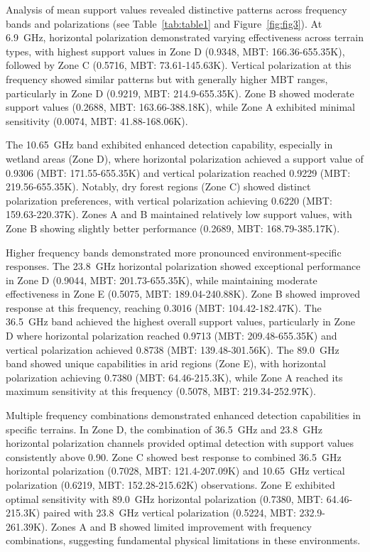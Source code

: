 \documentclass[preprint,review,12pt,authoryear]{elsarticle}
\begin{document}
Analysis of mean support values revealed distinctive patterns across frequency bands and polarizations (see Table~\ref{tab:table1} and Figure~\ref{fig:fig3}). At 6.9~GHz, horizontal polarization demonstrated varying effectiveness across terrain types, with highest support values in Zone D (0.9348, MBT: 166.36-655.35K), followed by Zone C (0.5716, MBT: 73.61-145.63K). Vertical polarization at this frequency showed similar patterns but with generally higher MBT ranges, particularly in Zone D (0.9219, MBT: 214.9-655.35K). Zone B showed moderate support values (0.2688, MBT: 163.66-388.18K), while Zone A exhibited minimal sensitivity (0.0074, MBT: 41.88-168.06K).

The 10.65~GHz band exhibited enhanced detection capability, especially in wetland areas (Zone D), where horizontal polarization achieved a support value of 0.9306 (MBT: 171.55-655.35K) and vertical polarization reached 0.9229 (MBT: 219.56-655.35K). Notably, dry forest regions (Zone C) showed distinct polarization preferences, with vertical polarization achieving 0.6220 (MBT: 159.63-220.37K). Zones A and B maintained relatively low support values, with Zone B showing slightly better performance (0.2689, MBT: 168.79-385.17K).

Higher frequency bands demonstrated more pronounced environment-specific responses. The 23.8~GHz horizontal polarization showed exceptional performance in Zone D (0.9044, MBT: 201.73-655.35K), while maintaining moderate effectiveness in Zone E (0.5075, MBT: 189.04-240.88K). Zone B showed improved response at this frequency, reaching 0.3016 (MBT: 104.42-182.47K). The 36.5~GHz band achieved the highest overall support values, particularly in Zone D where horizontal polarization reached 0.9713 (MBT: 209.48-655.35K) and vertical polarization achieved 0.8738 (MBT: 139.48-301.56K). The 89.0~GHz band showed unique capabilities in arid regions (Zone E), with horizontal polarization achieving 0.7380 (MBT: 64.46-215.3K), while Zone A reached its maximum sensitivity at this frequency (0.5078, MBT: 219.34-252.97K).

Multiple frequency combinations demonstrated enhanced detection capabilities in specific terrains. In Zone D, the combination of 36.5~GHz and 23.8~GHz horizontal polarization channels provided optimal detection with support values consistently above 0.90. Zone C showed best response to combined 36.5~GHz horizontal polarization (0.7028, MBT: 121.4-207.09K) and 10.65~GHz vertical polarization (0.6219, MBT: 152.28-215.62K) observations. Zone E exhibited optimal sensitivity with 89.0~GHz horizontal polarization (0.7380, MBT: 64.46-215.3K) paired with 23.8~GHz vertical polarization (0.5224, MBT: 232.9-261.39K). Zones A and B showed limited improvement with frequency combinations, suggesting fundamental physical limitations in these environments.
\end{document}
